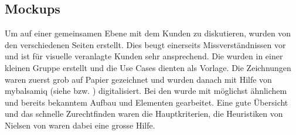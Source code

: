 \FloatBarrier
\subsection{Mockups}\label{mockups}
Um auf einer gemeinsamen Ebene mit dem Kunden zu diskutieren, wurden  von den verschiedenen Seiten erstellt. Dies beugt einerseits Missverständnissen vor und ist für visuelle veranlagte Kunden sehr ansprechend. Die  wurden in einer kleinen Gruppe erstellt und die Use Cases dienten als Vorlage. Die Zeichnungen waren zuerst grob auf Papier gezeichnet und wurden danach mit Hilfe von mybalsamiq (siehe \cite{zhaw_mybalsamiq} bzw. \cite{mybalsamiq}) digitalisiert. Bei den  wurde mit möglichst ähnlichem und bereits bekanntem Aufbau und Elementen gearbeitet. Eine gute Übersicht und das schnelle Zurechtfinden waren die Hauptkriterien, die Heuristiken von Nielsen von \cite{paper_usability} waren dabei eine grosse Hilfe.

